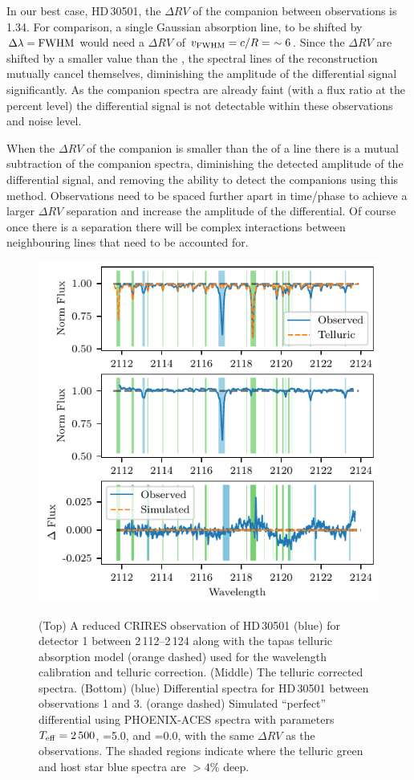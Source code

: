 In our best case, {HD\,30501}, the \(\Delta {RV}\) of the companion between observations is 1.34\kmps{}. For comparison, a single Gaussian absorption line, to be shifted by \(\Delta\lambda = {\textrm{FWHM}}\) would need a \(\Delta {RV}\) of \(v_{\textrm{FWHM}} = c/R =~\sim6\)\kmps{}. Since the \(\Delta {RV}\) are shifted by a smaller value than the {\fwhm}, the spectral lines of the reconstruction mutually cancel themselves, diminishing the amplitude of the differential signal significantly. As the companion spectra are already faint (with a flux ratio at the percent level) the differential signal is not detectable within these observations and noise level.

When the \(\Delta {RV}\) of the companion is smaller than the {\fwhm} of a line there is a mutual subtraction of the companion spectra, diminishing the detected amplitude of the differential signal, and removing the ability to detect the companions using this method. Observations need to be spaced further apart in time/phase to achieve a larger \(\Delta {RV}\) separation and increase the amplitude of the differential. Of course once there is a separation there will be complex interactions between neighbouring lines that need to be accounted for.

\begin{figure}
    \centering
    \includegraphics[width=0.8\hsize]{figures/direct-recovery/differential.pdf}\\
    \caption{(Top) A reduced {CRIRES} observation of {HD\,30501} (blue) for detector 1 between 2\,112--2\,124\nm{} along with the tapas telluric absorption model ({orange} dashed) used for the wavelength calibration and telluric correction.
        (Middle) The telluric corrected spectra.
        (Bottom) ({blue}) Differential spectra for {HD\,30501} between observations 1 and 3. ({orange} dashed) Simulated ``perfect'' differential using {PHOENIX-ACES} spectra with parameters \(T_{\mathrm{eff}}{}=2\,500\)\K{}, \logg{}=5.0, and \feh{}=0.0, with the same \(\Delta {RV}\) as the observations.
        The shaded regions indicate where the telluric {green} and host star {blue} spectra are \(> 4\%\) deep.}
    \label{fig:spectral_example}
\end{figure}

